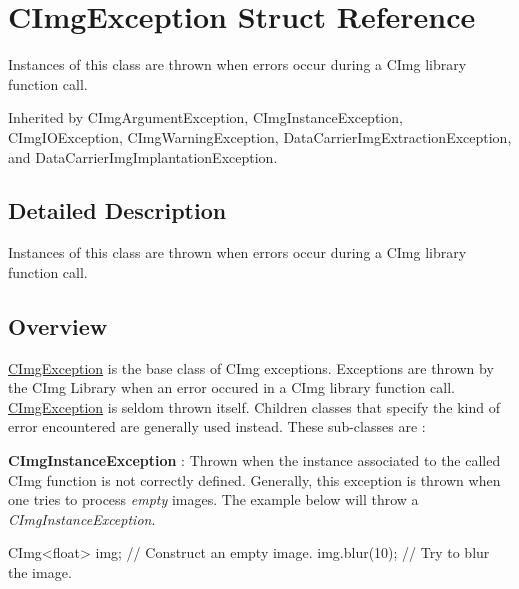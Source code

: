 \hypertarget{structcimg__library_1_1CImgException}{
\section{CImgException Struct Reference}
\label{structcimg__library_1_1CImgException}
}


Instances of this class are thrown when errors occur during a CImg library function call.  




Inherited by CImgArgumentException, CImgInstanceException, CImgIOException, CImgWarningException, DataCarrierImgExtractionException, and DataCarrierImgImplantationException.



\subsection{Detailed Description}
Instances of this class are thrown when errors occur during a CImg library function call. \hypertarget{structcimg__library_1_1CImgException_ex1}{}\subsection{Overview}\label{structcimg__library_1_1CImgException_ex1}
\hyperlink{structcimg__library_1_1CImgException}{CImgException} is the base class of CImg exceptions. Exceptions are thrown by the CImg Library when an error occured in a CImg library function call. \hyperlink{structcimg__library_1_1CImgException}{CImgException} is seldom thrown itself. Children classes that specify the kind of error encountered are generally used instead. These sub-\/classes are :


\begin{DoxyItemize}
\item {\bfseries CImgInstanceException} : Thrown when the instance associated to the called CImg function is not correctly defined. Generally, this exception is thrown when one tries to process {\itshape empty\/} images. The example below will throw a {\itshape CImgInstanceException\/}. 
\begin{DoxyCode}
      CImg<float> img;        // Construct an empty image.
      img.blur(10);           // Try to blur the image.
\end{DoxyCode}

\end{DoxyItemize}


